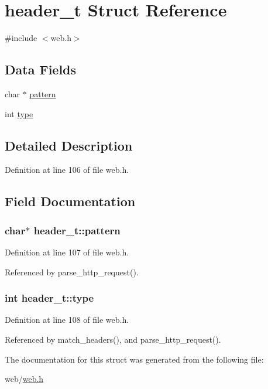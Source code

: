 \hypertarget{structheader__t}{}\section{header\+\_\+t Struct Reference}
\label{structheader__t}


{\ttfamily \#include $<$web.\+h$>$}

\subsection*{Data Fields}
\begin{DoxyCompactItemize}
\item 
char $\ast$ \hyperlink{structheader__t_a389d7564d1b1fd7b7ace82e15525e18c}{pattern}
\item 
int \hyperlink{structheader__t_a1f179d0a706f9ec29e1ac8ef9e67b8af}{type}
\end{DoxyCompactItemize}


\subsection{Detailed Description}


Definition at line 106 of file web.\+h.



\subsection{Field Documentation}
\subsubsection[{\texorpdfstring{pattern}{pattern}}]{\setlength{\rightskip}{0pt plus 5cm}char$\ast$ header\+\_\+t\+::pattern}\hypertarget{structheader__t_a389d7564d1b1fd7b7ace82e15525e18c}{}\label{structheader__t_a389d7564d1b1fd7b7ace82e15525e18c}


Definition at line 107 of file web.\+h.



Referenced by parse\+\_\+http\+\_\+request().

\subsubsection[{\texorpdfstring{type}{type}}]{\setlength{\rightskip}{0pt plus 5cm}int header\+\_\+t\+::type}\hypertarget{structheader__t_a1f179d0a706f9ec29e1ac8ef9e67b8af}{}\label{structheader__t_a1f179d0a706f9ec29e1ac8ef9e67b8af}


Definition at line 108 of file web.\+h.



Referenced by match\+\_\+headers(), and parse\+\_\+http\+\_\+request().



The documentation for this struct was generated from the following file\+:\begin{DoxyCompactItemize}
\item 
web/\hyperlink{web_8h}{web.\+h}\end{DoxyCompactItemize}
